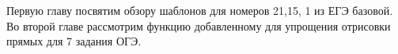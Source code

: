 
Первую главу посвятим обзору шаблонов для номеров 21,15, 1 из ЕГЭ базовой.
Во второй главе рассмотрим функцию добавленному для упрощения отрисовки прямых для 7 задания ОГЭ.

